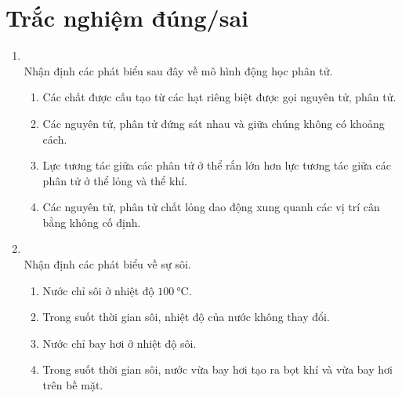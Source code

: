 \section{Trắc nghiệm đúng/sai}
\begin{enumerate}[label=\bfseries Câu \arabic*:, leftmargin=1.7cm]
	\item{}\\
	Nhận định các phát biểu sau đây về mô hình động học phân tử.
	\begin{enumerate}[label=\alph*)]
		\item Các chất được cấu tạo từ các hạt riêng biệt được gọi nguyên tử, phân tử.
		\item Các nguyên tử, phân tử đứng sát nhau và giữa chúng không có khoảng cách.
		\item Lực tương tác giữa các phân tử ở thể rắn lớn hơn lực tương tác giữa các phân tử ở thể lỏng và thể khí.
		\item Các nguyên tử, phân tử chất lỏng dao động xung quanh các vị trí cân bằng không cố định.
	\end{enumerate}

\item {}\\
Nhận định các phát biểu về sự sôi.
\begin{enumerate}[label=\alph*)]
	\item Nước chỉ sôi ở nhiệt độ $\SI{100}{\celsius}$.
	\item Trong suốt thời gian sôi, nhiệt độ của nước không thay đổi.
	\item Nước chỉ bay hơi ở nhiệt độ sôi.
	\item Trong suốt thời gian sôi, nước vừa bay hơi tạo ra bọt khí và vừa bay hơi trên bề mặt.
\end{enumerate}


\end{enumerate}
